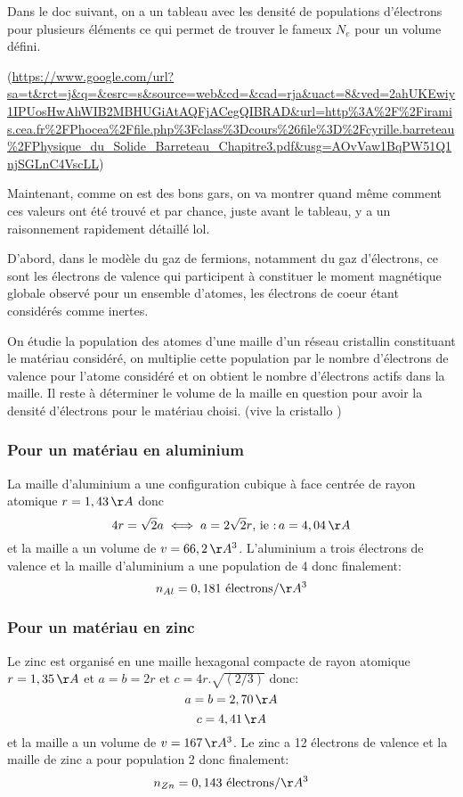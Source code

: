 \documentclass{article}
\begin{document}
Dans le doc suivant, on a un tableau avec les densité de populations d'électrons pour plusieurs éléments ce qui permet de trouver le fameux $N_e$ pour un volume défini.

(\url{https://www.google.com/url?sa=t&rct=j&q=&esrc=s&source=web&cd=&cad=rja&uact=8&ved=2ahUKEwiy1IPUosHwAhWIB2MBHUGiAtAQFjACegQIBRAD&url=http%3A%2F%2Firamis.cea.fr%2FPhocea%2Ffile.php%3Fclass%3Dcours%26file%3D%2Fcyrille.barreteau%2FPhysique_du_Solide_Barreteau_Chapitre3.pdf&usg=AOvVaw1BqPW51Q1njSGLnC4VscLL})

Maintenant, comme on est des bons gars, on va montrer quand même comment ces valeurs ont été trouvé et par chance, juste avant le tableau, y a un raisonnement rapidement détaillé lol.

D'abord, dans le modèle du gaz de fermions, notamment du gaz d'électrons, ce sont les électrons de valence qui participent à constituer le moment magnétique globale observé pour un ensemble d'atomes, les électrons de coeur étant considérés comme inertes.

On étudie la population des atomes d'une maille d'un réseau cristallin constituant le matériau considéré, on multiplie cette population par le nombre d'électrons de valence pour l'atome considéré et on obtient le nombre d'électrons actifs dans la maille. Il reste à déterminer le volume de la maille en question pour avoir la densité d'électrons pour le matériau choisi. (vive la cristallo \smiley{})
\subsubsection{Pour un matériau en aluminium}

La maille d'aluminium a une configuration cubique à face centrée de rayon atomique $r=1,43\,\AA$ donc $$4r=\sqrt{2}a \iff a = 2\sqrt{2}r \mbox{, ie :} \, a = 4,04\,\AA$$
et la maille a un volume de $v = 66,2 \,\AA^3$. L'aluminium a trois électrons de valence et la maille d'aluminium a une population de 4 donc finalement:
$$n_{Al} = 0,181 \text{ électrons} / \AA^3$$

\subsubsection{Pour un matériau en zinc}
Le zinc est organisé en une maille hexagonal compacte de rayon atomique $r=1,35 \,\AA$ et $a = b = 2r \mbox{ et }c = 4r.\sqrt{(2 / 3)}$ donc:
$$a=b=2,70\,\AA$$
$$c=4,41\,\AA$$
et la maille a un volume de $v = 167\,\AA^3$. Le zinc a 12 électrons de valence et la maille de zinc a pour population 2 donc finalement:
$$n_{Zn} = 0,143 \text{ électrons} / \AA^3$$
\end{document}

